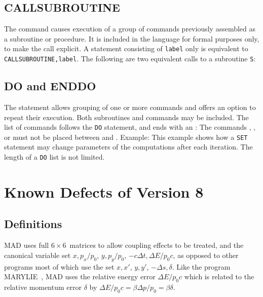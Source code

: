 \section{CALLSUBROUTINE}
\label{S-CALLSUB}
The  command causes execution of a group
of commands previously assembled as a subroutine or procedure.
It is included in the language for formal purposes only,
to make the call explicit.
A statement consisting of {\tt label} only is
equivalent to {\tt CALLSUBROUTINE,label}.
The following are two equivalent calls to a subroutine {\tt S}:
 
\section{DO and ENDDO}
\label{S-DO}
The  statement allows grouping of one or more commands
and offers an option to repeat their execution.
Both subroutines and commands may be included.
The list of commands follows the {\tt DO} statement,
and ends with an :
\myxmp{
DO,TIMES = integer] \\
xxx\=\kill
   \>\{command\} \\
ENDDO
}
The commands , ,
or  must not be placed between  and .
Example:
This example shows how a {\tt SET} statement may change
parameters of the computations after each iteration.
The length of a {\tt DO} list is not limited.

\chapter{Known Defects of Version 8}
 
\section{Definitions}
MAD uses full \(6 \times 6\)~matrices to allow coupling effects to
be treated, and the canonical variable set
\(x, p_x/p_0\), \(y, p_y/p_0\), \(-c \Delta t, \Delta E/p_0 c\),
as opposed to other programs most of which use the set
\(x, x'\), \(y, y'\), \(- \Delta s, \delta\).
Like the program MARYLIE~\cite{B-DRA81},
MAD uses the relative energy error
\(\Delta E / p_0 c\)
which is related to the relative momentum error \(\delta\) by
\(\Delta E / p_0 c = \beta \Delta p / p_0 = \beta \delta\).
 
